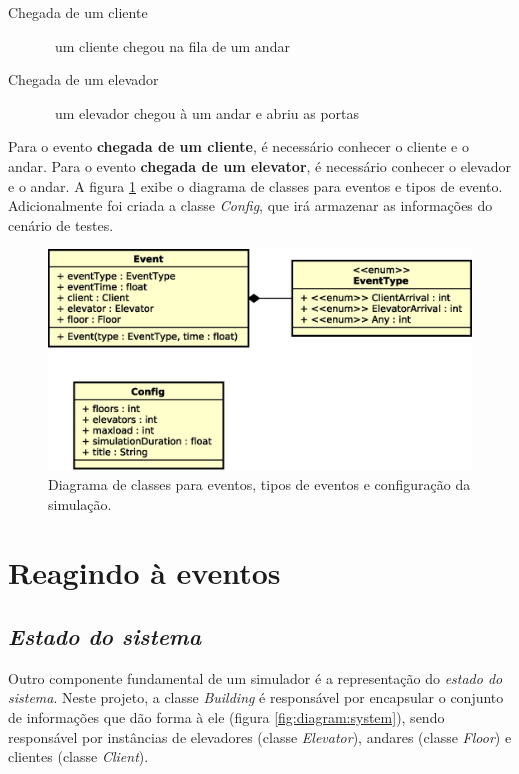 \begin{description}
  \item[Chegada de um cliente] \hfill \ um cliente chegou na fila de um andar
  \item[Chegada de um elevador] \hfill \ um elevador chegou à um andar e abriu as portas
\end{description}

Para o evento \textbf{chegada de um cliente}, é necessário conhecer o cliente e
o andar. Para o evento \textbf{chegada de um elevator}, é necessário conhecer o
elevador e o andar. A figura \ref{fig:diagram:event} exibe o diagrama de classes
para eventos e tipos de evento. Adicionalmente foi criada a classe
\textit{Config}, que irá armazenar as informações do cenário de testes.

\begin{figure}[htb!]
  \centering
  \includegraphics[scale=0.6]{img/Basic.eps}
  \caption{Diagrama de classes para eventos, tipos de eventos e configuração da simulação.}
\label{fig:diagram:event}
\end{figure}

\section{Reagindo à eventos}

\subsection{\textit{Estado do sistema}}

Outro componente fundamental de um simulador é a representação do \textit{estado
do sistema}. Neste projeto, a classe \textit{Building} é responsável por
encapsular o conjunto de informações que dão forma à ele (figura
\ref{fig:diagram:system}), sendo responsável por instâncias de elevadores
(classe \textit{Elevator}), andares (classe \textit{Floor}) e clientes (classe
\textit{Client}).

